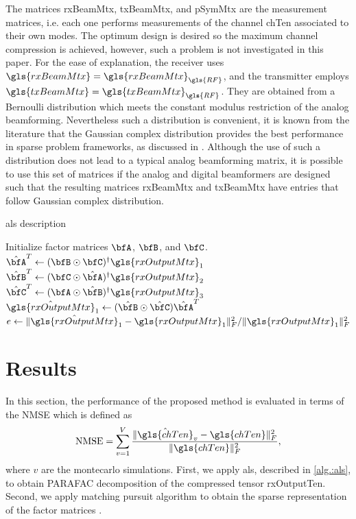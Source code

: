 \documentclass[conference]{IEEEtran}
\begin{document}
The matrices \gls{rxBeamMtx},
\gls{txBeamMtx}, and \gls{pSymMtx} are the measurement matrices, i.e. each one
performs measurements of the channel \gls{chTen} associated to their own modes.
The optimum design is desired so the maximum channel compression is achieved,
however, such a problem  is not investigated in this paper. For the ease of
explanation, the receiver uses $\gls{rxBeamMtx} =
\gls{rxBeamMtx}_{\gls{RF}}$,  and the transmitter employs $\gls{txBeamMtx} =
\gls{txBeamMtx}_{\gls{RF}}$. They are obtained from a Bernoulli distribution which meets the constant
modulus restriction of the analog beamforming. Nevertheless such a distribution
is convenient, it is known from the
literature that the Gaussian complex distribution provides the best
performance in sparse problem frameworks, as discussed in  \cite{Donoho:2006}.
Although the use of such a distribution does not lead to a typical analog beamforming
matrix, it is possible to use this set of matrices if the analog
and digital beamformers are designed such that the resulting matrices
\gls{rxBeamMtx} and \gls{txBeamMtx} have entries that follow 
Gaussian complex distribution. 


\label{sec:algorithm}
\begin{algorithm}   
    \caption{\gls{als} description } \label{alg.:als}
    \begin{algorithmic}
      \STATE Initialize factor matrices $\bfA$, $\bfB$, and $\bfC$.
      \STATE $\hat{\bfA}^T \gets (\bfB \odot \bfC)^{\dagger}\gls{rxOutputMtx}_1 $
      \STATE $\hat{\bfB}^T \gets (\bfC \odot \hat{\bfA})^{\dagger}\gls{rxOutputMtx}_2 $
      \STATE $\hat{\bfC}^T \gets ({\bfA} \odot \hat{\bfB})^{\dagger}\gls{rxOutputMtx}_3 $
      \STATE $\hat{\gls{rxOutputMtx}}_1 \gets (\hat{\bfB} \odot \hat{\bfC})\hat{\bfA}^T$
      \STATE $ e \gets \|\hat{\gls{rxOutputMtx}}_1 - \gls{rxOutputMtx}_1 \|^2_F/ \|\gls{rxOutputMtx}_1\|_F^2$
      \ENDWHILE

      
    \end{algorithmic}
\end{algorithm}

\section{Results}

In this section, the performance of the proposed method is
evaluated in terms of the \gls{NMSE} which is defined as 
\begin{equation}
  \label{eq:nmse}
  \textrm{NMSE} = \sum^{V}_{v=1} \frac{\|\hat{\gls{chTen}}_v - \gls{chTen} \|^{2}_F}{\|\gls{chTen} \|^{2}_F},
\end{equation}
where $v$ are the montecarlo simulations.
First, we apply \gls{als}, described in
\ref{alg.:als}, to obtain \gls{PARAFAC} decomposition of the compressed tensor \gls{rxOutputTen}.
Second, we apply matching pursuit algorithm to obtain the sparse representation
of the factor matrices \cite{Tropp:2008}.
\end{document}
